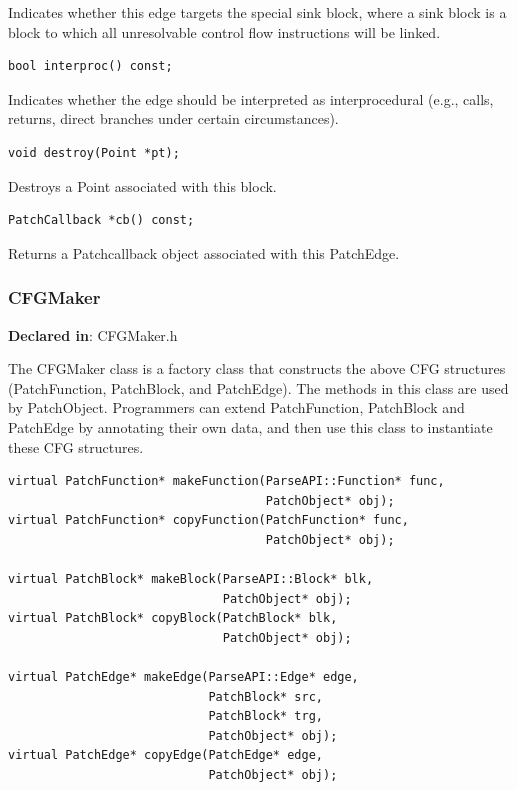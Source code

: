 \documentclass[11pt]{article}
\begin{document}
Indicates whether this edge targets the special sink block, where a sink block
is a block to which all unresolvable control ﬂow instructions will be
linked.


\begin{verbatim}
bool interproc() const;

\end{verbatim}



Indicates whether the edge should be interpreted as interprocedural (e.g.,
calls, returns, direct branches under certain circumstances).


\begin{verbatim}
void destroy(Point *pt);

\end{verbatim}



Destroys a Point associated with this block.


\begin{verbatim}
PatchCallback *cb() const;

\end{verbatim}



Returns a Patchcallback object associated with this PatchEdge.

\subsubsection{CFGMaker}
\label{sec-3.2.12}

\textbf{Declared in}: CFGMaker.h

The CFGMaker class is a factory class that constructs the above CFG structures
(PatchFunction, PatchBlock, and PatchEdge). The methods in this class are used
by PatchObject. Programmers can extend PatchFunction, PatchBlock and PatchEdge
by annotating their own data, and then use this class to instantiate these CFG
structures.


\begin{verbatim}
virtual PatchFunction* makeFunction(ParseAPI::Function* func,
                                    PatchObject* obj);
virtual PatchFunction* copyFunction(PatchFunction* func,
                                    PatchObject* obj);

virtual PatchBlock* makeBlock(ParseAPI::Block* blk,
                              PatchObject* obj);
virtual PatchBlock* copyBlock(PatchBlock* blk,
                              PatchObject* obj);

virtual PatchEdge* makeEdge(ParseAPI::Edge* edge,
                            PatchBlock* src,
                            PatchBlock* trg,
                            PatchObject* obj);
virtual PatchEdge* copyEdge(PatchEdge* edge,
                            PatchObject* obj);

\end{verbatim}
\end{document}
